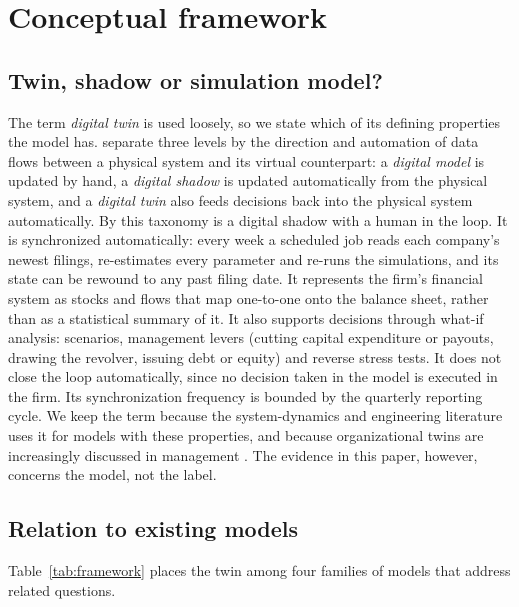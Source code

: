 \section{Conceptual framework}\label{sec:framework}

\subsection{Twin, shadow or simulation model?}
The term \emph{digital twin} is used loosely, so we state which of its defining properties the model has. \citet{kritzinger2018} separate three levels by the direction and automation of data flows between a physical system and its virtual counterpart: a \emph{digital model} is updated by hand, a \emph{digital shadow} is updated automatically from the physical system, and a \emph{digital twin} also feeds decisions back into the physical system automatically. By this taxonomy \twin{} is a digital shadow with a human in the loop. It is synchronized automatically: every week a scheduled job reads each company's newest filings, re-estimates every parameter and re-runs the simulations, and its state can be rewound to any past filing date. It represents the firm's financial system as stocks and flows that map one-to-one onto the balance sheet, rather than as a statistical summary of it. It also supports decisions through what-if analysis: scenarios, management levers (cutting capital expenditure or payouts, drawing the revolver, issuing debt or equity) and reverse stress tests. It does not close the loop automatically, since no decision taken in the model is executed in the firm. Its synchronization frequency is bounded by the quarterly reporting cycle. We keep the term because the system-dynamics and engineering literature uses it for models with these properties, and because organizational twins are increasingly discussed in management \citep{lyytinen2023}. The evidence in this paper, however, concerns the model, not the label.

\subsection{Relation to existing models}
Table~\ref{tab:framework} places the twin among four families of models that address related questions.

